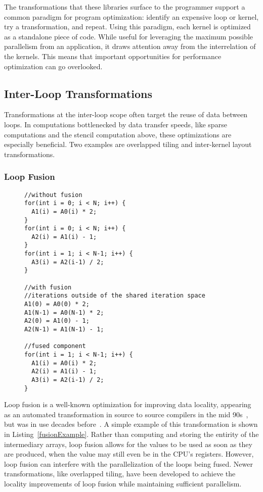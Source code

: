 The transformations that these libraries surface to the programmer support a common paradigm for program optimization: identify an expensive loop or kernel, try a transformation, and repeat.
Using this paradigm, each kernel is optimized as a standalone piece of code.
While useful for leveraging the maximum possible parallelism from an application, it draws attention away from the interrelation of the kernels.
This means that important opportunities for performance optimization can go overlooked.


\subsection{Inter-Loop Transformations}
Transformations at the inter-loop scope often target the reuse of data between loops.
In computations bottlenecked by data transfer speeds, like sparse computations and the stencil computation above, these optimizations are especially beneficial. 
Two examples are overlapped tiling and inter-kernel layout transformations.

\subsubsection{Loop Fusion}
\begin{figure}
\begin{lstlisting}[caption={Three loops, with and without loop fusion.},label=fusionExample]
//without fusion
for(int i = 0; i < N; i++) {
  A1(i) = A0(i) * 2;
}
for(int i = 0; i < N; i++) {
  A2(i) = A1(i) - 1;
}
for(int i = 1; i < N-1; i++) {
  A3(i) = A2(i-1) / 2;
}

//with fusion
//iterations outside of the shared iteration space
A1(0) = A0(0) * 2;
A1(N-1) = A0(N-1) * 2;
A2(0) = A1(0) - 1;
A2(N-1) = A1(N-1) - 1;

//fused component
for(int i = 1; i < N-1; i++) {
  A1(i) = A0(i) * 2;
  A2(i) = A1(i) - 1;
  A3(i) = A2(i-1) / 2;
}
\end{lstlisting}
\end{figure}

Loop fusion is a well-known optimization for improving data locality, appearing as an automated transformation in source to source compilers in the mid 90s~\cite{mckinley1996improving}, but was in use decades before~\cite{warren1984hierarchical,cocke1971catalogue}.
A simple example of this transformation is shown in Listing~\ref{fusionExample}.
Rather than computing and storing the entirity of the intermediary arrays, loop fusion allows for the values to be used as soon as they are produced, when the value may still even be in the CPU's registers.
However, loop fusion can interfere with the parallelization of the loops being fused.
Newer transformations, like overlapped tiling, have been developed to achieve the locality improvements of loop fusion while maintaining sufficient parallelism.

